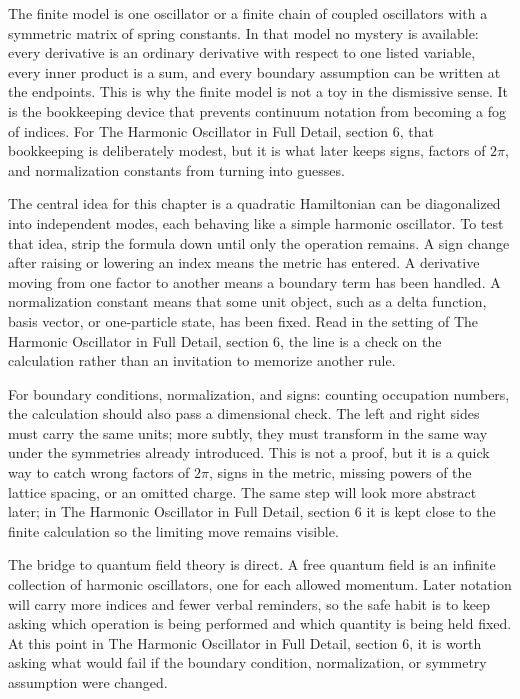 The finite model is one oscillator or a finite chain of coupled oscillators with a symmetric matrix of spring constants.  In that model no mystery is available: every derivative is an ordinary derivative with respect to one listed variable, every inner product is a sum, and every boundary assumption can be written at the endpoints.  This is why the finite model is not a toy in the dismissive sense.  It is the bookkeeping device that prevents continuum notation from becoming a fog of indices.  For The Harmonic Oscillator in Full Detail, section 6, that bookkeeping is deliberately modest, but it is what later keeps signs, factors of \(2\pi\), and normalization constants from turning into guesses.

The central idea for this chapter is a quadratic Hamiltonian can be diagonalized into independent modes, each behaving like a simple harmonic oscillator.  To test that idea, strip the formula down until only the operation remains.  A sign change after raising or lowering an index means the metric has entered.  A derivative moving from one factor to another means a boundary term has been handled.  A normalization constant means that some unit object, such as a delta function, basis vector, or one-particle state, has been fixed.  Read in the setting of The Harmonic Oscillator in Full Detail, section 6, the line is a check on the calculation rather than an invitation to memorize another rule.

For boundary conditions, normalization, and signs: counting occupation numbers, the calculation should also pass a dimensional check.  The left and right sides must carry the same units; more subtly, they must transform in the same way under the symmetries already introduced.  This is not a proof, but it is a quick way to catch wrong factors of \(2\pi\), signs in the metric, missing powers of the lattice spacing, or an omitted charge.  The same step will look more abstract later; in The Harmonic Oscillator in Full Detail, section 6 it is kept close to the finite calculation so the limiting move remains visible.

The bridge to quantum field theory is direct.  A free quantum field is an infinite collection of harmonic oscillators, one for each allowed momentum.  Later notation will carry more indices and fewer verbal reminders, so the safe habit is to keep asking which operation is being performed and which quantity is being held fixed.  At this point in The Harmonic Oscillator in Full Detail, section 6, it is worth asking what would fail if the boundary condition, normalization, or symmetry assumption were changed.

